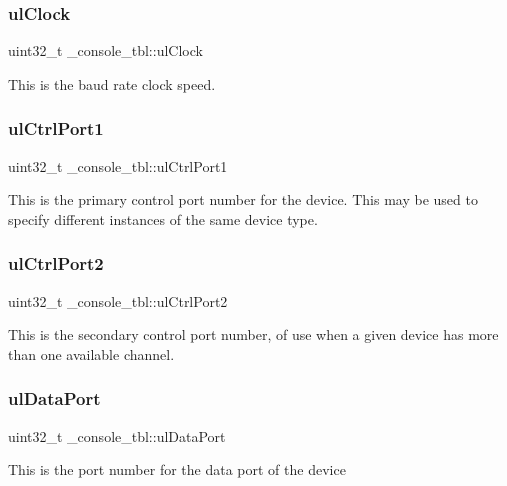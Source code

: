 \subsubsection{\texorpdfstring{ulClock}{ulClock}}
{\footnotesize\ttfamily uint32\+\_\+t \+\_\+console\+\_\+tbl\+::ul\+Clock}

This is the baud rate clock speed. \mbox{\label{struct__console__tbl_a19184d155c1e538fb219544a409c0372}} 
\subsubsection{\texorpdfstring{ulCtrlPort1}{ulCtrlPort1}}
{\footnotesize\ttfamily uint32\+\_\+t \+\_\+console\+\_\+tbl\+::ul\+Ctrl\+Port1}

This is the primary control port number for the device. This may be used to specify different instances of the same device type. \mbox{\label{struct__console__tbl_a5d2f221b15d9adaca8e425c5418822e4}} 
\subsubsection{\texorpdfstring{ulCtrlPort2}{ulCtrlPort2}}
{\footnotesize\ttfamily uint32\+\_\+t \+\_\+console\+\_\+tbl\+::ul\+Ctrl\+Port2}

This is the secondary control port number, of use when a given device has more than one available channel. \mbox{\label{struct__console__tbl_a29ab9bc78c3de156fa9684a0c3db4ffa}} 
\subsubsection{\texorpdfstring{ulDataPort}{ulDataPort}}
{\footnotesize\ttfamily uint32\+\_\+t \+\_\+console\+\_\+tbl\+::ul\+Data\+Port}

This is the port number for the data port of the device \mbox{\label{struct__console__tbl_a9918fca6cdf20e888e20d31088061d98}} 
